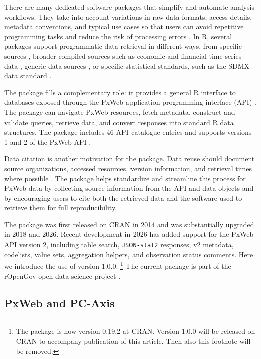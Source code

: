 There are many dedicated software packages that simplify and automate analysis workflows.
They take into account variations in raw data formats, access details, metadata conventions, and typical use cases so that users can avoid repetitive programming tasks and reduce the risk of processing errors \citep{GrovesLyberg2010}.
In R, several packages support programmatic data retrieval in different ways, from specific sources \citep{Lahti17eurostat, WDI}, broader compiled sources such as economic and financial time-series data \citep{pdfetch}, generic data sources \citep{szocs2020webchem, caro2017intsvy}, or specific statistical standards, such as the SDMX data standard \citep{rsdmx}.

The  package \citep{pxweb} fills a complementary role: it provides a general R interface to databases exposed through the PxWeb application programming interface (API) \citep{PxToolsPxWeb2Intro}.
The package can navigate PxWeb resources, fetch metadata, construct and validate queries, retrieve data, and convert responses into standard R data structures.
The package includes 46 API catalogue entries and supports versions 1 and 2 of the PxWeb API \citep{PxToolsPxWeb2Intro}.

Data citation is another motivation for the package.
Data reuse should document source organizations, accessed resources, version information, and retrieval times where possible \citep{Parsons2019}.
The  package helps standardize and streamline this process for PxWeb data by collecting source information from the API and data objects and by encouraging users to cite both the retrieved data and the software used to retrieve them for full reproducibility.

The  package was first released on CRAN in 2014 and was substantially upgraded in 2018 and 2026.
Recent development in 2026 has added support for the PxWeb API version 2, including table search, \texttt{JSON-stat2} responses, v2 metadata, codelists, value sets, aggregation helpers, and observation status comments.
Here we introduce the use of \citep{pxweb} version 1.0.0. \footnote{The package is now version 0.19.2 at CRAN. Version 1.0.0 will be released on CRAN to accompany publication of this article. Then also this footnote will be removed.}
The current package is part of the rOpenGov open data science project \citep{Lahti13icml}.

\subsection[PxWeb and PC-Axis]{PxWeb and PC-Axis}
\label{sec:pxweb-pcaxis}

